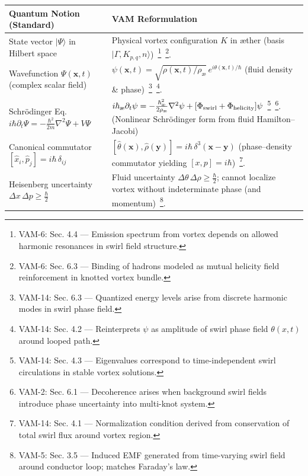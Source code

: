 \documentclass[a4paper,12pt]{article}
\begin{document}
    \begin{table}[H]
        \centering
        \scriptsize
        \begin{tabular}{p{} | p{}}
            \hline
            \textbf{Quantum Notion (Standard)} & \textbf{VAM Reformulation} \\
            \hline
            State vector $|\Psi\rangle$ in Hilbert space & Physical vortex configuration $K$ in æther (basis $|\Gamma, K_{p,q}, n\rangle$)~\footnote{VAM-6: Sec. 4.4 — Emission spectrum from vortex depends on allowed harmonic resonances in swirl field structure.}~\footnote{VAM-6: Sec. 6.3 — Binding of hadrons modeled as mutual helicity field reinforcement in knotted vortex bundle.}. \\
            Wavefunction $\Psi(\mathbf{x},t)$ (complex scalar field) & $\psi(\mathbf{x},t) = \sqrt{\rho(\mathbf{x},t)/\rho_{\text{\ae}}}\,e^{i\theta(\mathbf{x},t)/\hbar}$ (fluid density \& phase)~\footnote{VAM-14: Sec. 6.3 — Quantized energy levels arise from discrete harmonic modes in swirl phase field.}~\footnote{VAM-14: Sec. 4.2 — Reinterprets $\psi$ as amplitude of swirl phase field $\theta(x,t)$ around looped path.}. \\
            Schrödinger Eq. $i\hbar\partial_t\Psi = -\frac{\hbar^2}{2m}\nabla^2\Psi + V\Psi$ & $i\hbar_{\text{\ae}}\partial_t\psi = -\frac{\hbar_{\text{\ae}}^2}{2\rho_{\text{\ae}}}\nabla^2\psi + [\Phi_{\rm swirl}+\Phi_{\rm helicity}]\psi$~\footnote{VAM-14: Sec. 4.3 — Eigenvalues correspond to time-independent swirl circulations in stable vortex solutions.}~\footnote{VAM-2: Sec. 6.1 — Decoherence arises when background swirl fields introduce phase uncertainty into multi-knot system.}. (Nonlinear Schrödinger form from fluid Hamilton–Jacobi) \\
            Canonical commutator $[ \hat{x}_i, \hat{p}_j ] = i\hbar\,\delta_{ij}$ & $[\hat{\theta}(\mathbf{x}), \hat{\rho}(\mathbf{y})] = i\hbar\,\delta^3(\mathbf{x}-\mathbf{y})$ (phase–density commutator yielding $[x,p]=i\hbar$)~\footnote{VAM-14: Sec. 4.1 — Normalization condition derived from conservation of total swirl flux around vortex region.}. \\
            Heisenberg uncertainty $\Delta x\,\Delta p \ge \frac{\hbar}{2}$ & Fluid uncertainty $\Delta \theta\,\Delta \rho \ge \frac{\hbar}{2}$; cannot localize vortex without indeterminate phase (and momentum)~\footnote{VAM-5: Sec. 3.5 — Induced EMF generated from time-varying swirl field around conductor loop; matches Faraday’s law.}. \\

\end{tabular}
\end{table}
\end{document}
